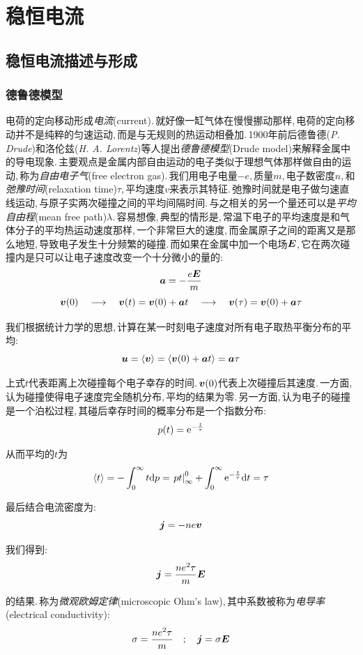 \chapter{稳恒电流}


\section{稳恒电流描述与形成}
\subsection{德鲁德模型}
电荷的定向移动形成\emph{电流}(current).\,就好像一缸气体在慢慢挪动那样,\,电荷的定向移动并不是纯粹的匀速运动,\,而是与无规则的热运动相叠加.\,1900年前后德鲁德({\it P. Drude})和洛伦兹({\it H. A. Lorentz})等人提出\emph{德鲁德模型}(Drude model)来解释金属中的导电现象.\,主要观点是金属内部自由运动的电子类似于理想气体那样做自由的运动,\,称为\emph{自由电子气}(free electron gas).\,我们用电子电量$-e$,\,质量$m$,\,电子数密度$n$,\,和\emph{弛豫时间}(relaxation time)$\tau$,\,平均速度$v$来表示其特征.\,弛豫时间就是电子做匀速直线运动,\,与原子实两次碰撞之间的平均间隔时间.\,与之相关的另一个量还可以是\emph{平均自由程}(mean free path)$\lambda$.\,容易想像,\,典型的情形是,\,常温下电子的平均速度是和气体分子的平均热运动速度那样,\,一个非常巨大的速度,\,而金属原子之间的距离又是那么地短,\,导致电子发生十分频繁的碰撞.\,而如果在金属中加一个电场$\boldsymbol{E}$,\,它在两次碰撞内是只可以让电子速度改变一个十分微小的量的:
\[\boldsymbol{a}=-\frac{e\boldsymbol{E}}{m}\]
\[\boldsymbol{v}(0)\quad\longrightarrow\quad\boldsymbol{v}(t)=\boldsymbol{v}(0)+\boldsymbol{a}t\quad\longrightarrow\quad\boldsymbol{v}(\tau)=\boldsymbol{v}(0)+\boldsymbol{a}\tau\]

我们根据统计力学的思想,\,计算在某一时刻电子速度对所有电子取热平衡分布的平均:
\[\boldsymbol{u}=\langle\boldsymbol{v}\rangle=\langle\boldsymbol{v}(0) +\boldsymbol{a}t\rangle = \boldsymbol{a}\tau\]

上式$t$代表距离上次碰撞每个电子幸存的时间.\,$\boldsymbol{v}(0)$代表上次碰撞后其速度.\,一方面,\,认为碰撞使得电子速度完全随机分布,\,平均的结果为零.\,另一方面,\,认为电子的碰撞是一个泊松过程,\,其碰后幸存时间的概率分布是一个指数分布:
\[p(t)={\rm e}^{-\frac{t}{\tau}}\]

从而平均的$t$为
\[\langle t\rangle=-\int_0^\infty t\textrm{d} p=\left. pt\right|^0_\infty+\int_0^\infty {\rm e}^{-\frac{t}{\tau}} \textrm{d} t=\tau\]

最后结合电流密度为:
\[\boldsymbol{j}=-ne\boldsymbol{v}\]

我们得到:
\[\boldsymbol{j}=\frac{ne^2 \tau}{m}\boldsymbol{E}\]

的结果.\,称为\emph{微观欧姆定律}(microscopic Ohm's law),\,其中系数被称为\emph{电导率}(electrical conductivity):
\[\sigma=\frac{ne^2 \tau}{m}\quad;\quad \boldsymbol{j}=\sigma\boldsymbol{E}\]

